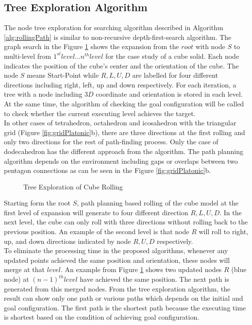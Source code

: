 \subsection{Tree Exploration Algorithm}
The node tree exploration for searching algorithm described in Algorithm \ref{alg:rollingPath} is similar to non-recursive depth-first-search algorithm. The graph search in the Figure \ref{fig:nodeTree} shows the expansion from the $root$ with node $S$ to multi-level from $1^{st} level ... n^{th} level$ for the case study of a cube solid.
%
Each node indicates the position of the cube's center and the orientation of the cube. The node $S$ means Start-Point while $R,L,U,D$ are labelled for four different directions including right, left, up and down respectively. 
%
For each iteration, a tree with a node including $3D$ coordinate and orientation is stored in each level. At the same time, the algorithm of checking the goal configuration will be called to check whether the current executing level achieves the target.\\


\noindent In other cases of tetrahedron, octahedron and icosahedron with the triangular grid (Figure \ref{fig:gridPlatonic}b), there are three directions at the first rolling and only two directions for the rest of path-finding process.
%
Only the case of dodecahedron has the different approach from the algorithm. The path planning algorithm depends on the environment including gaps or overlaps between two pentagon connections as can be seen in the Figure \ref{fig:gridPlatonic}b.
%
\vskip 0.5cm
\begin{figure}[h]
	
	\caption{Tree Exploration of Cube Rolling}
\label{fig:nodeTree}
\end{figure}

\noindent Starting form the root $S$, path planning based rolling of the cube model at the first level of expansion will generate to four different direction $R,L,U,D$. In the next level, the cube can only roll with three directions without rolling back to the previous position.  
An example of the second level is that node $R$ will roll to right, up, and down directions indicated by node $R,U,D$ respectively.\\
% 

\noindent To eliminate the processing time in the proposed algorithms, whenever any updated points achieved the same position and orientation, these nodes will merge at that $level$. An example from Figure \ref{fig:nodeTree} shows two updated nodes $R$ (blue node) at $(n-1)^{th} level$ have achieved the same position. The next path is generated from this merged nodes. 
%
From the tree exploration algorithm, the result can show only one path or various paths which depends on the initial and goal configuration. The first path is the shortest path because the executing time is shortest based on the condition of achieving goal configuration.
% 
%	
%
\clearpage
\newpage